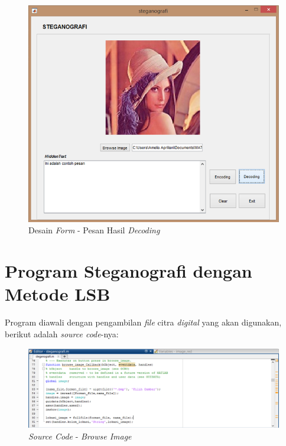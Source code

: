 	\begin{figure}[H]
		\centering
		\includegraphics[width=1\textwidth]{gambar/mockup/5}
		\caption{Desain \emph{Form} - Pesan Hasil \emph{Decoding}}
		\label{desain_pesan}
	\end{figure}

\section{Program Steganografi dengan Metode LSB}
Program diawali dengan pengambilan \emph{file} citra \emph{digital} yang akan digunakan, berikut adalah \emph{source code}-nya:
	\begin{figure}[H]
		\centering
		\includegraphics[width=1\textwidth]{gambar/source_code/browse_image}
		\caption{\emph{Source Code} - \emph{Browse Image}}
		\label{browse_image}
	\end{figure}

